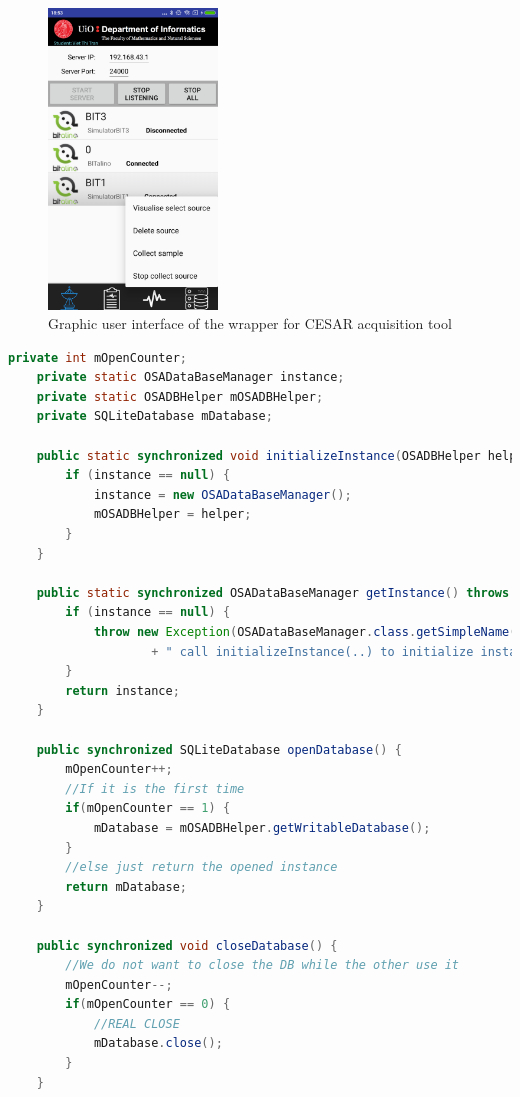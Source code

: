 \begin{figure}
    \centering
    \includegraphics[width=0.4\textwidth]{Figures/CESARGUIWrapper.png}
    \caption{Graphic user interface of the wrapper for CESAR acquisition tool}
    \label{fig:Figures/CESARGUIWrapper}
\end{figure}
\begin{lstlisting}[caption={SQLite connection management}, label = {listing:SQLiteConnection}, captionpos=b, language=Java]
    private int mOpenCounter;
	private static OSADataBaseManager instance;
	private static OSADBHelper mOSADBHelper;
	private SQLiteDatabase mDatabase;

	public static synchronized void initializeInstance(OSADBHelper helper) {
	    if (instance == null) {
	        instance = new OSADataBaseManager();
	        mOSADBHelper = helper;
	    }
	}

	public static synchronized OSADataBaseManager getInstance() throws Exception{
	    if (instance == null) {
	        throw new Exception(OSADataBaseManager.class.getSimpleName() 
	                + " call initializeInstance(..) to initialize instance.");
	    }
	    return instance;
	}

	public synchronized SQLiteDatabase openDatabase() {
	    mOpenCounter++;
	    //If it is the first time
	    if(mOpenCounter == 1) {
	        mDatabase = mOSADBHelper.getWritableDatabase();
	    }
	    //else just return the opened instance
	    return mDatabase;
	}

	public synchronized void closeDatabase() {
	    //We do not want to close the DB while the other use it
	    mOpenCounter--;
	    if(mOpenCounter == 0) {
	        //REAL CLOSE
	        mDatabase.close();
	    }
	}
\end{lstlisting}
